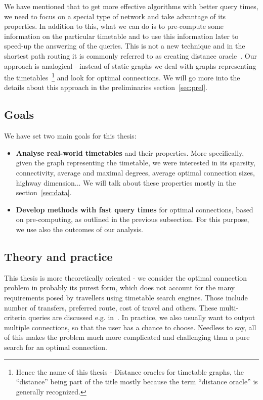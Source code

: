 	\noindent We have mentioned that to get more effective algorithms with better query times, we need to focus on a special type of network and take advantage of its properties. In addition to this, what we can do is to pre-compute some information on the particular timetable and to use this information later to speed-up the answering of the queries. This is not a new technique and in the shortest path routing it is commonly referred to as creating distance oracle~\cite{apxdo05}. Our approach is analogical - instead of static graphs we deal with graphs representing the timetables~\footnote{Hence the name of this thesis - Distance oracles for timetable graphs, the ``distance'' being part of the title mostly because the term ``distance oracle'' is generally recognized.} and look for optimal connections. We will go more into the details about this approach in the preliminaries section~\ref{sec:prel}.
	
\subsection{Goals}
	
	\noindent We have set two main goals for this thesis:
	\begin{itemize}
		\item \textbf{Analyse real-world timetables} and their properties. More specifically, given the graph representing the timetable, we were interested in its sparsity, connectivity, average and maximal degrees, average optimal connection sizes, highway dimension... We will talk about these properties mostly in the section~\ref{sec:data}. 
		\item \textbf{Develop methods with fast query times} for optimal connections, based on pre-computing, as outlined in the previous subsection. For this purpose, we use also the outcomes of our analysis.
	\end{itemize}
	
\subsection{Theory and practice}

	\noindent This thesis is more theoretically oriented - we consider the optimal connection problem in probably its purest form, which does not account for the many requirements posed by travellers using timetable search engines. Those include number of transfers, preferred route, cost of travel and others. These multi-criteria queries are discussed e.g. in~\cite{timetablemodelsalgs07}. In practice, we also usually want to output multiple connections, so that the user has a chance to choose. Needless to say, all of this makes the problem much more complicated and challenging than a pure search for an optimal connection.
	
